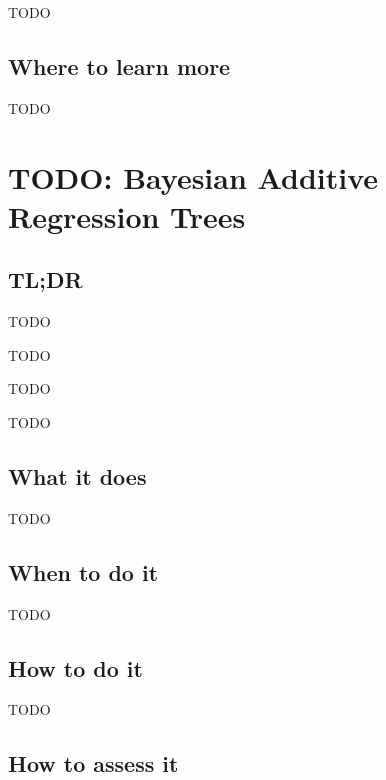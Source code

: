 \documentclass[
]{book}
\providecommand{\tightlist}{%
  \setlength{\itemsep}{0pt}\setlength{\parskip}{0pt}}
\begin{document}
TODO

\hypertarget{where-to-learn-more-17}{%
\section{Where to learn more}\label{where-to-learn-more-17}}

TODO

\hypertarget{bayesian-additive-regression-trees}{%
\chapter{TODO: Bayesian Additive Regression Trees}\label{bayesian-additive-regression-trees}}

\hypertarget{tldr-18}{%
\section{TL;DR}\label{tldr-18}}

\begin{description}
\tightlist
\item[What it does]
TODO
\item[When to do it]
TODO
\item[How to do it]
TODO
\item[How to assess it]
TODO
\end{description}

\hypertarget{what-it-does-18}{%
\section{What it does}\label{what-it-does-18}}

TODO

\hypertarget{when-to-do-it-18}{%
\section{When to do it}\label{when-to-do-it-18}}

TODO

\hypertarget{how-to-do-it-18}{%
\section{How to do it}\label{how-to-do-it-18}}

TODO

\hypertarget{how-to-assess-it-18}{%
\section{How to assess it}\label{how-to-assess-it-18}}
\end{document}
